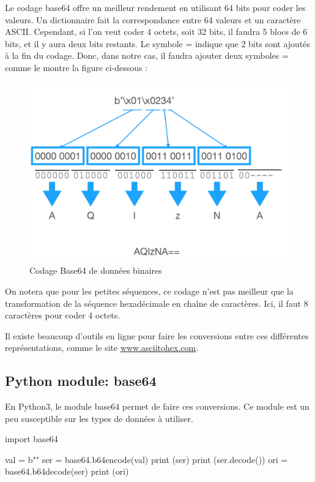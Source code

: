 Le codage base64 offre un meilleur rendement en utilisant 64 bits pour coder les valeurs. Un dictionnaire fait la correspondance entre 64 valeurs et un caractère ASCII. Cependant, si l'on veut coder 4 octets, soit 32 bits, il faudra 5 blocs de 6 bits, et il y aura deux bits restants. Le symbole = indique que 2 bits sont ajoutés à la fin du codage. Donc, dans notre cas, il faudra ajouter deux symboles = comme le montre la figure ci-dessous :

\begin{figure}[tbp]
\centerline{\includegraphics[width=1\columnwidth]{Pictures/Capture21.png}}
\caption{Codage Base64 de données binaires}
\label{fig-base64}
\end{figure}

On notera que pour les petites séquences, ce codage n'est pas meilleur que la transformation de la séquence hexadécimale en chaîne de caractères. Ici, il faut 8 caractères pour coder 4 octets. 

Il existe beaucoup d'outils en ligne pour faire les conversions entre ces différentes représentations, comme le site \url{www.asciitohex.com}.

\subsection*{Python module: base64}

En Python3, le module base64 permet de faire ces conversions.  Ce module est un peu susceptible sur les types de données à utiliser.

\begin{python}[numbers=left,numbersep=5pt]
import base64

val = b""
ser = base64.b64encode(val)
print (ser)
print (ser.decode())
ori = base64.b64decode(ser)
print (ori)
\end{python}

